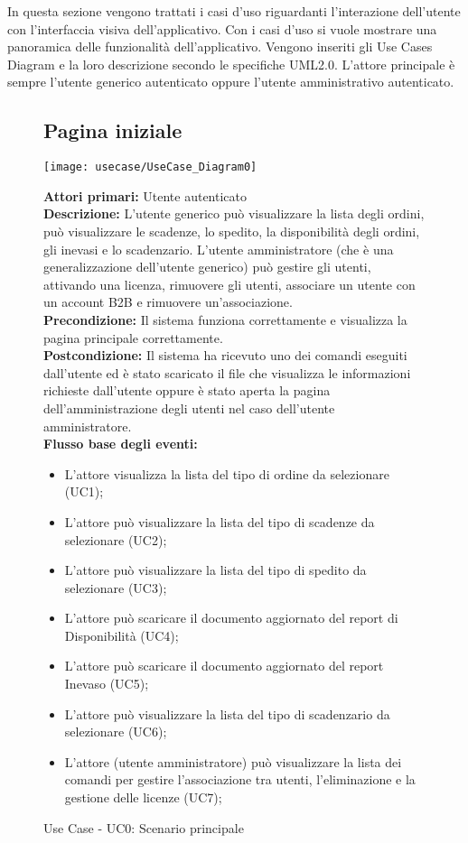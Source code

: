 In questa sezione vengono trattati i casi d'uso riguardanti l'interazione dell'utente con l'interfaccia visiva dell'applicativo. Con i casi d'uso si vuole mostrare una panoramica delle funzionalità dell'applicativo. Vengono inseriti gli Use Cases Diagram e la loro descrizione secondo le specifiche UML2.0. L'attore principale è sempre l'utente generico autenticato oppure l'utente  amministrativo autenticato.
\begin{figure}[h!]
\subsection{Pagina iniziale } 
   \begin{center}
    \texttt{[image: usecase/UseCase\_Diagram0]} 
    \caption{Use Case - UC0: Scenario principale}
    \end{center}



\textbf{Attori primari:}   Utente autenticato\\

\textbf{Descrizione:} L'utente generico può visualizzare la lista degli ordini, può visualizzare le scadenze, lo spedito, la disponibilità degli ordini, gli inevasi e lo scadenzario. L'utente amministratore (che è una generalizzazione dell'utente generico) può gestire gli utenti, attivando una licenza, rimuovere gli utenti, associare un utente con un account B2B e rimuovere un'associazione. \\

\textbf{Precondizione:}  Il sistema funziona correttamente e visualizza la pagina principale correttamente. \\

\textbf{Postcondizione:} Il sistema ha ricevuto uno dei comandi eseguiti dall'utente ed è stato scaricato il file che visualizza le informazioni richieste dall'utente oppure è stato aperta la pagina dell'amministrazione degli utenti nel caso dell'utente amministratore.\\


\textbf{Flusso base degli eventi:}   
\begin{itemize}
\item L'attore visualizza la lista del tipo di ordine da selezionare (UC1);
\item L'attore può visualizzare la lista del tipo di scadenze da selezionare (UC2);
\item L'attore può visualizzare la lista del tipo di spedito da selezionare (UC3);
\item L'attore può scaricare il documento aggiornato  del report di Disponibilità (UC4);
\item L'attore può scaricare il documento aggiornato del report Inevaso (UC5);
\item L'attore può visualizzare la lista del tipo di scadenzario da selezionare (UC6);
\item L'attore (utente amministratore) può visualizzare la lista dei comandi per gestire l'associazione tra utenti, l'eliminazione e la gestione delle licenze (UC7);
\end{itemize}
\end{figure}




